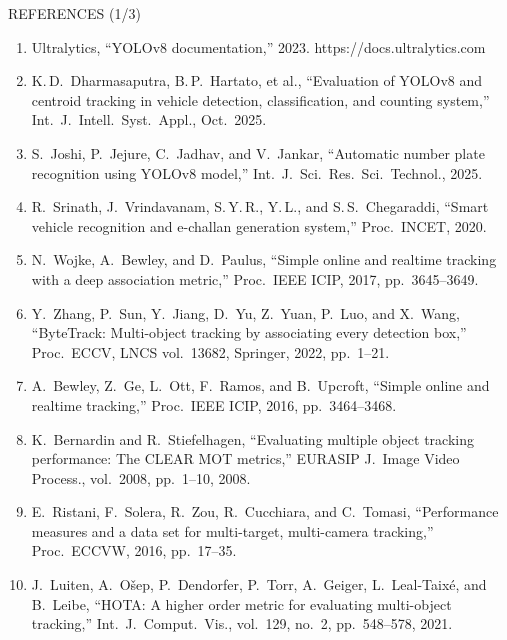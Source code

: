 \documentclass[aspectratio=169,10pt,t]{beamer}
\begin{document}
\begin{frame}{REFERENCES (1/3)}
\scriptsize
\begin{enumerate}\setlength{\itemsep}{0.05em}
\item[{[1]}] Ultralytics, ``YOLOv8 documentation,'' 2023. https://docs.ultralytics.com
\item[{[2]}] K.\,D.\ Dharmasaputra, B.\,P.\ Hartato, et al., ``Evaluation of YOLOv8 and centroid tracking in vehicle detection, classification, and counting system,'' Int.\ J.\ Intell.\ Syst.\ Appl., Oct.\ 2025.
\item[{[3]}] S.\ Joshi, P.\ Jejure, C.\ Jadhav, and V.\ Jankar, ``Automatic number plate recognition using YOLOv8 model,'' Int.\ J.\ Sci.\ Res.\ Sci.\ Technol., 2025.
\item[{[4]}] R.\ Srinath, J.\ Vrindavanam, S.\,Y.\,R., Y.\,L., and S.\,S.\ Chegaraddi, ``Smart vehicle recognition and e-challan generation system,'' Proc.\ INCET, 2020.
\item[{[5]}] N.\ Wojke, A.\ Bewley, and D.\ Paulus, ``Simple online and realtime tracking with a deep association metric,'' Proc.\ IEEE ICIP, 2017, pp.\ 3645--3649.
\item[{[6]}] Y.\ Zhang, P.\ Sun, Y.\ Jiang, D.\ Yu, Z.\ Yuan, P.\ Luo, and X.\ Wang, ``ByteTrack: Multi-object tracking by associating every detection box,'' Proc.\ ECCV, LNCS vol.\ 13682, Springer, 2022, pp.\ 1--21.
\item[{[7]}] A.\ Bewley, Z.\ Ge, L.\ Ott, F.\ Ramos, and B.\ Upcroft, ``Simple online and realtime tracking,'' Proc.\ IEEE ICIP, 2016, pp.\ 3464--3468.
\item[{[8]}] K.\ Bernardin and R.\ Stiefelhagen, ``Evaluating multiple object tracking performance: The CLEAR MOT metrics,'' EURASIP J.\ Image Video Process., vol.\ 2008, pp.\ 1--10, 2008.
\item[{[9]}] E.\ Ristani, F.\ Solera, R.\ Zou, R.\ Cucchiara, and C.\ Tomasi, ``Performance measures and a data set for multi-target, multi-camera tracking,'' Proc.\ ECCVW, 2016, pp.\ 17--35.
\item[{[10]}] J.\ Luiten, A.\ O\v{s}ep, P.\ Dendorfer, P.\ Torr, A.\ Geiger, L.\ Leal-Taix\'e, and B.\ Leibe, ``HOTA: A higher order metric for evaluating multi-object tracking,'' Int.\ J.\ Comput.\ Vis., vol.\ 129, no.\ 2, pp.\ 548--578, 2021.
\end{enumerate}
\end{frame}
\end{document}
